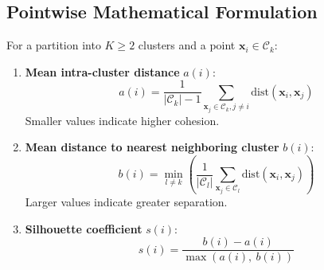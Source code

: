 \subsection{Pointwise Mathematical Formulation}
For a partition into $K \ge 2$ clusters and a point $\mathbf{x}_i \in \mathcal{C}_k$:
\begin{enumerate}
    \item \textbf{Mean intra-cluster distance} $a(i)$:
    \begin{equation}
    \label{eq:dm-silhouette-a-en}
    a(i) = \frac{1}{|\mathcal{C}_k| - 1} \sum_{\mathbf{x}_j \in \mathcal{C}_k, j \ne i} \mathrm{dist}(\mathbf{x}_i, \mathbf{x}_j)
    \end{equation}
    Smaller values indicate higher cohesion.
    
    \item \textbf{Mean distance to nearest neighboring cluster} $b(i)$:
    \begin{equation}
    \label{eq:dm-silhouette-b-en}
    b(i) = \min_{l \ne k} \left( \frac{1}{|\mathcal{C}_l|} \sum_{\mathbf{x}_j \in \mathcal{C}_l} \mathrm{dist}(\mathbf{x}_i, \mathbf{x}_j) \right)
    \end{equation}
    Larger values indicate greater separation.
    
    \item \textbf{Silhouette coefficient} $s(i)$:
    \begin{equation}
    \label{eq:dm-silhouette-s-en}
    s(i) = \frac{b(i) - a(i)}{\max\left(a(i), \ b(i)\right)}
    \end{equation}
\end{enumerate}


